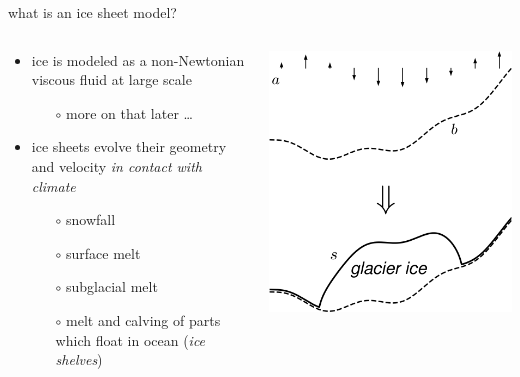 \documentclass[svgnames,
               hyperref={colorlinks,citecolor=DeepPink4,linkcolor=FireBrick,urlcolor=Maroon},
               usepdftitle=false]  %
               {beamer}
\begin{document}
\begin{frame}{what is an ice sheet model?}

\begin{columns}
\begin{column}{0.63\textwidth}
\begin{itemize}
\item ice is modeled as a non-Newtonian viscous fluid at large scale
    \begin{itemize}
    \item[$\circ$] more on that later \dots
    \end{itemize}
\item ice sheets evolve their geometry and velocity \emph{in contact with climate}
    \begin{itemize}
    \item[$\circ$] snowfall
    \item[$\circ$] surface melt
    \item[$\circ$] subglacial melt
    \item[$\circ$] melt and calving of parts which float in ocean (\emph{ice shelves})
    \end{itemize}
\end{itemize}
\end{column}
\begin{column}{0.4\textwidth}
\includegraphics[width=\textwidth]{images/coverfig.png}
\end{column}
\end{columns}
\end{frame}
\end{document}
